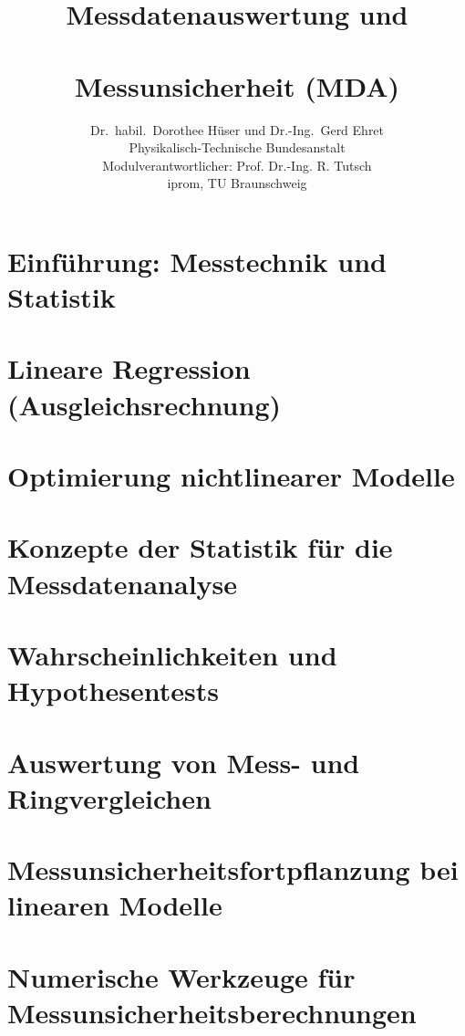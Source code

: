 \documentclass[a4paper,11pt]{book}
\title{\normalfont\sffamily\bfseries{\Huge{Messdatenauswertung und\\~\\ Messunsicherheit (MDA)}}}
\author{Dr.\ habil.\ Dorothee Hüser und Dr.-Ing.\ Gerd Ehret\\
Physikalisch-Technische Bundesanstalt\\
Modulverantwortlicher: Prof. Dr.-Ing. R. Tutsch\\
iprom, TU Braunschweig}
\begin{document}
\frontmatter                            %
\maketitle                              %
\tableofcontents                        %
\mainmatter                             %

\chapter{Einführung: Messtechnik und Statistik}

%
\chapter{Lineare Regression (Ausgleichsrechnung)}
\label{KapitellinReg}

%
\chapter{Optimierung nichtlinearer Modelle}
\label{nonlinOpti}


\chapter{Konzepte der Statistik für die Messdatenanalyse}
\label{konzepteStatistik}

%
\chapter{Wahrscheinlichkeiten und Hypothesentests}
\label{wahrscheinlichHyp}

%
\chapter{Auswertung von Mess- und Ringvergleichen}

%
\chapter{Messunsicherheitsfortpflanzung bei linearen Modelle}
\label{unsicherheitsfortpfLin}

%
\chapter{Numerische Werkzeuge für Messunsicherheitsberechnungen}

%
\end{document}
